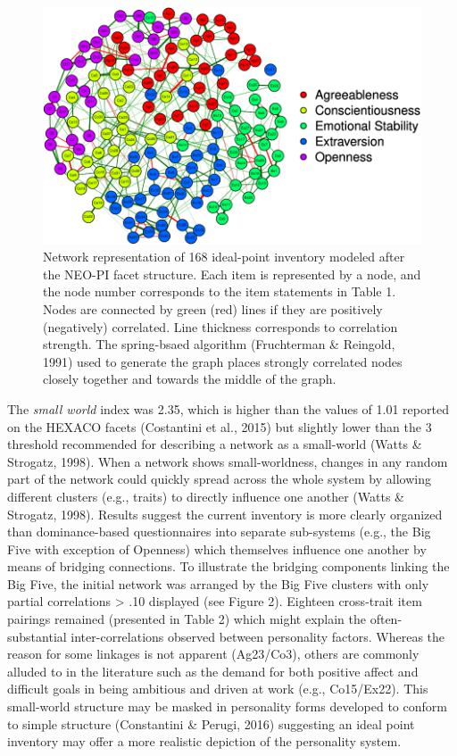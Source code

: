\documentclass[man]{apa6}
\begin{document}
\begin{figure}
\centering
\includegraphics{Ideal_Point_Items_and_Network_Analysis_files/figure-latex/unnamed-chunk-4-1.pdf}
\caption{\label{fig:unnamed-chunk-4}Network representation of 168
ideal-point inventory modeled after the NEO-PI facet structure. Each
item is represented by a node, and the node number corresponds to the
item statements in Table 1. Nodes are connected by green (red) lines if
they are positively (negatively) correlated. Line thickness corresponds
to correlation strength. The spring-bsaed algorithm (Fruchterman \&
Reingold, 1991) used to generate the graph places strongly correlated
nodes closely together and towards the middle of the graph.}
\end{figure}

The \emph{small world} index was 2.35, which is higher than the values
of 1.01 reported on the HEXACO facets (Costantini et al., 2015) but
slightly lower than the 3 threshold recommended for describing a network
as a small-world (Watts \& Strogatz, 1998). When a network shows
small-worldness, changes in any random part of the network could quickly
spread across the whole system by allowing different clusters (e.g.,
traits) to directly influence one another (Watts \& Strogatz, 1998).
Results suggest the current inventory is more clearly organized than
dominance-based questionnaires into separate sub-systems (e.g., the Big
Five with exception of Openness) which themselves influence one another
by means of bridging connections. To illustrate the bridging components
linking the Big Five, the initial network was arranged by the Big Five
clusters with only partial correlations \textgreater{} .10 displayed
(see Figure 2). Eighteen cross-trait item pairings remained (presented
in Table 2) which might explain the often-substantial inter-correlations
observed between personality factors. Whereas the reason for some
linkages is not apparent (Ag23/Co3), others are commonly alluded to in
the literature such as the demand for both positive affect and difficult
goals in being ambitious and driven at work (e.g., Co15/Ex22). This
small-world structure may be masked in personality forms developed to
conform to simple structure (Constantini \& Perugi, 2016) suggesting an
ideal point inventory may offer a more realistic depiction of the
personality system.
\end{document}
